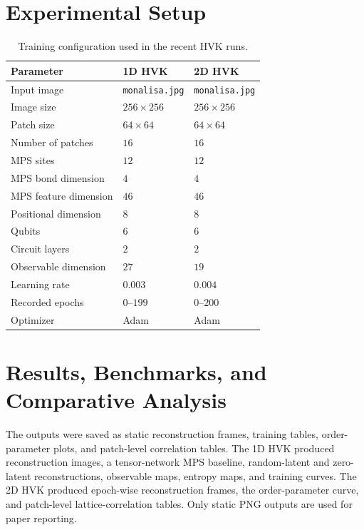\documentclass[11pt]{article}
\begin{document}
\section{Experimental Setup}

\begin{table}[h]
\centering
\caption{Training configuration used in the recent HVK runs.}
\begin{tabular}{lll}
\toprule
Parameter & 1D HVK & 2D HVK \\
\midrule
Input image & \texttt{monalisa.jpg} & \texttt{monalisa.jpg} \\
Image size & $256 \times 256$ & $256 \times 256$ \\
Patch size & $64 \times 64$ & $64 \times 64$ \\
Number of patches & $16$ & $16$ \\
MPS sites & $12$ & $12$ \\
MPS bond dimension & $4$ & $4$ \\
MPS feature dimension & $46$ & $46$ \\
Positional dimension & $8$ & $8$ \\
Qubits & $6$ & $6$ \\
Circuit layers & $2$ & $2$ \\
Observable dimension & $27$ & $19$ \\
Learning rate & $0.003$ & $0.004$ \\
Recorded epochs & $0$--$199$ & $0$--$200$ \\
Optimizer & Adam & Adam \\
\bottomrule
\end{tabular}
\end{table}

\section{Results, Benchmarks, and Comparative Analysis}

The outputs were saved as static reconstruction frames, training tables, order-parameter plots, and patch-level correlation tables. The 1D HVK produced reconstruction images, a tensor-network MPS baseline, random-latent and zero-latent reconstructions, observable maps, entropy maps, and training curves. The 2D HVK produced epoch-wise reconstruction frames, the order-parameter curve, and patch-level lattice-correlation tables. Only static PNG outputs are used for paper reporting.
\end{document}
